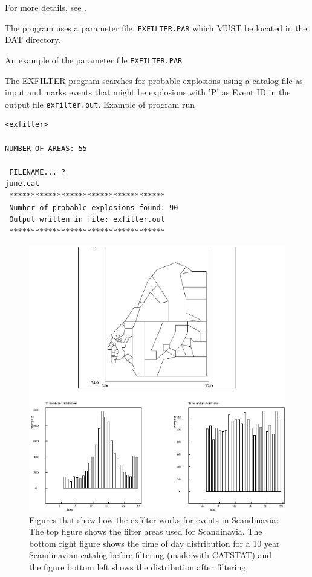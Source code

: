 For more details, see \citet{ottemoller1995}.

The program uses a parameter file, \texttt{EXFILTER.PAR} which MUST be located in the DAT directory. 

An example of the parameter file \texttt{EXFILTER.PAR}



The EXFILTER program searches for probable explosions using a 
catalog-file as input and marks events that might be explosions with 
'P' as Event ID in the output file \texttt{exfilter.out}. 
Example of program run 

\begin{verbatim}
<exfilter> 

NUMBER OF AREAS: 55 

 FILENAME... ? 
june.cat
 ************************************
 Number of probable explosions found: 90
 Output written in file: exfilter.out
 ************************************ 
\end{verbatim}

\begin{figure}
\centerline{\includegraphics[width=0.9\linewidth]{fig/fig45}}
\caption{Figures that show how the exfilter works for events in Scandinavia:\newline
The top figure shows the filter areas used for Scandinavia. The bottom right figure shows the time of day distribution for a 10 year Scandinavian catalog before filtering (made with CATSTAT) and the figure bottom left shows the distribution after filtering.}
\label{fig:exfilter}
\end{figure}


